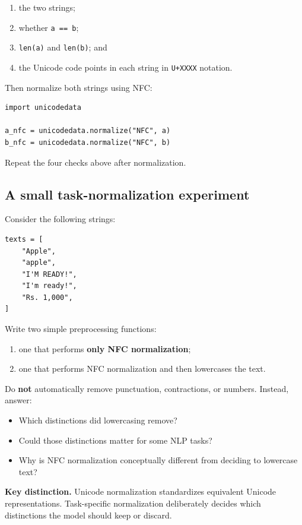 \documentclass[11pt,a4paper]{article}
\begin{document}
\begin{enumerate}
  \item the two strings;
  \item whether \texttt{a == b};
  \item \texttt{len(a)} and \texttt{len(b)}; and
  \item the Unicode code points in each string in \texttt{U+XXXX} notation.
\end{enumerate}

Then normalize both strings using NFC:

\begin{lstlisting}
import unicodedata

a_nfc = unicodedata.normalize("NFC", a)
b_nfc = unicodedata.normalize("NFC", b)
\end{lstlisting}

Repeat the four checks above after normalization.

\subsection{A small task-normalization experiment}

Consider the following strings:

\begin{lstlisting}
texts = [
    "Apple",
    "apple",
    "I'M READY!",
    "I'm ready!",
    "Rs. 1,000",
]
\end{lstlisting}

Write two simple preprocessing functions:

\begin{enumerate}
  \item one that performs \textbf{only NFC normalization};
  \item one that performs NFC normalization and then lowercases the text.
\end{enumerate}

Do \textbf{not} automatically remove punctuation, contractions, or numbers. Instead, answer:

\begin{itemize}
  \item Which distinctions did lowercasing remove?
  \item Could those distinctions matter for some NLP tasks?
  \item Why is NFC normalization conceptually different from deciding to lowercase text?
\end{itemize}

\begin{checkbox}
\textbf{Key distinction.} Unicode normalization standardizes equivalent Unicode representations. Task-specific normalization deliberately decides which distinctions the model should keep or discard.
\end{checkbox}
\end{document}
